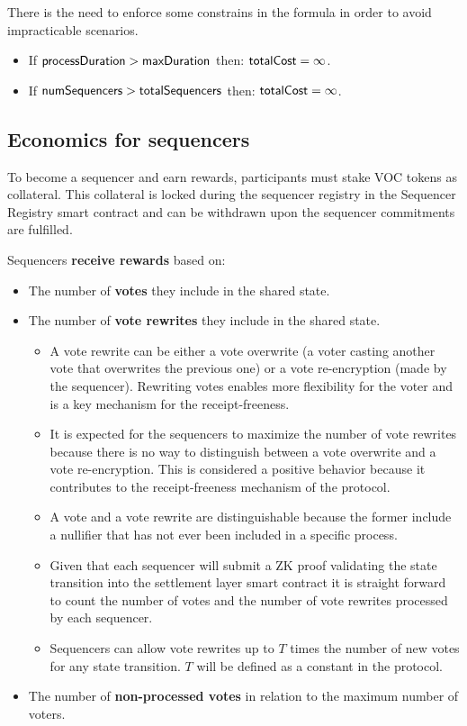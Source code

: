 There is the need to enforce some constrains in the formula in order to avoid impracticable scenarios.

\begin{itemize}
	\item If ${\sf{processDuration}} > {\sf{maxDuration}}$ then: ${\sf{totalCost}} = \infty$.
	\item If ${\sf{numSequencers}} > {\sf{totalSequencers}}$ then: ${\sf{totalCost}} = \infty$.
\end{itemize}

\subsection{Economics for sequencers}

To become a sequencer and earn rewards, participants must stake VOC tokens as collateral. This collateral is locked during the sequencer registry in the Sequencer Registry smart contract and can be withdrawn upon the sequencer commitments are fulfilled.

Sequencers \textbf{receive rewards} based on:

\begin{itemize}
	\item The number of \textbf{votes} they include in the shared state.
	\item The number of \textbf{vote rewrites} they include in the shared state.
	\begin{itemize}
		\item A vote rewrite can be either a vote overwrite (a voter casting another vote that overwrites the previous one) or a vote re-encryption (made by the sequencer). Rewriting votes enables more flexibility for the voter and is a key mechanism for the receipt-freeness.
		\item It is expected for the sequencers to maximize the number of vote rewrites because there is no way to distinguish between a vote overwrite and a vote re-encryption. This is considered a positive behavior because it contributes to the receipt-freeness mechanism of the protocol.
		\item A vote and a vote rewrite are distinguishable because the former include a nullifier that has not ever been included in a specific process.
		\item Given that each sequencer will submit a ZK proof validating the state transition into the settlement layer smart contract it is straight forward to count the number of votes and the number of vote rewrites processed by each sequencer.
		\item Sequencers can allow vote rewrites up to $T$ times the number of new votes for any state transition. $T$ will be defined as a constant in the protocol.
	\end{itemize}
	\item The number of \textbf{non-processed votes} in relation to the maximum number of voters.
\end{itemize}

